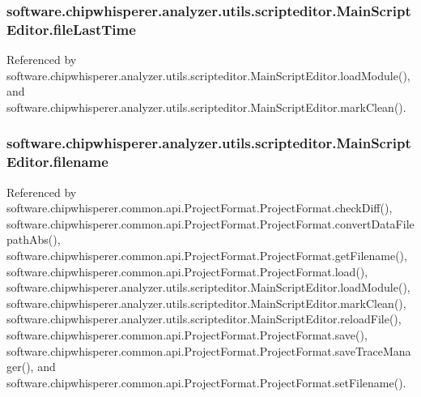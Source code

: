 \subsubsection[{file\+Last\+Time}]{\setlength{\rightskip}{0pt plus 5cm}software.\+chipwhisperer.\+analyzer.\+utils.\+scripteditor.\+Main\+Script\+Editor.\+file\+Last\+Time}\label{classsoftware_1_1chipwhisperer_1_1analyzer_1_1utils_1_1scripteditor_1_1MainScriptEditor_a87abe08a2e6c498cd3d609988229294c}


Referenced by software.\+chipwhisperer.\+analyzer.\+utils.\+scripteditor.\+Main\+Script\+Editor.\+load\+Module(), and software.\+chipwhisperer.\+analyzer.\+utils.\+scripteditor.\+Main\+Script\+Editor.\+mark\+Clean().

\hypertarget{classsoftware_1_1chipwhisperer_1_1analyzer_1_1utils_1_1scripteditor_1_1MainScriptEditor_ad28af7fb96b78c1d45631d308c27d69d}{}
\subsubsection[{filename}]{\setlength{\rightskip}{0pt plus 5cm}software.\+chipwhisperer.\+analyzer.\+utils.\+scripteditor.\+Main\+Script\+Editor.\+filename}\label{classsoftware_1_1chipwhisperer_1_1analyzer_1_1utils_1_1scripteditor_1_1MainScriptEditor_ad28af7fb96b78c1d45631d308c27d69d}


Referenced by software.\+chipwhisperer.\+common.\+api.\+Project\+Format.\+Project\+Format.\+check\+Diff(), software.\+chipwhisperer.\+common.\+api.\+Project\+Format.\+Project\+Format.\+convert\+Data\+Filepath\+Abs(), software.\+chipwhisperer.\+common.\+api.\+Project\+Format.\+Project\+Format.\+get\+Filename(), software.\+chipwhisperer.\+common.\+api.\+Project\+Format.\+Project\+Format.\+load(), software.\+chipwhisperer.\+analyzer.\+utils.\+scripteditor.\+Main\+Script\+Editor.\+load\+Module(), software.\+chipwhisperer.\+analyzer.\+utils.\+scripteditor.\+Main\+Script\+Editor.\+mark\+Clean(), software.\+chipwhisperer.\+analyzer.\+utils.\+scripteditor.\+Main\+Script\+Editor.\+reload\+File(), software.\+chipwhisperer.\+common.\+api.\+Project\+Format.\+Project\+Format.\+save(), software.\+chipwhisperer.\+common.\+api.\+Project\+Format.\+Project\+Format.\+save\+Trace\+Manager(), and software.\+chipwhisperer.\+common.\+api.\+Project\+Format.\+Project\+Format.\+set\+Filename().

